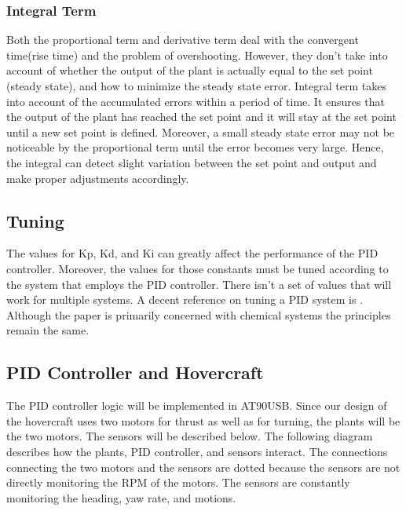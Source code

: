\subsubsection{Integral Term}
Both the proportional term and derivative term deal with the convergent time(rise time) and the problem of overshooting. However, they don't take into account of whether the output of the plant is actually equal to the set point (steady state), and how to minimize the steady state error. Integral term takes into account of the accumulated errors within a period of time. It ensures that the output of the plant has reached the set point and it will stay at the set point until a new set point is defined. Moreover, a small steady state error may not be noticeable by the proportional term until the error becomes very large. Hence, the integral can detect slight variation between the set point and output and make proper adjustments accordingly. 

\subsection{Tuning}
The values for Kp, Kd, and Ki can greatly affect the performance of the PID controller. Moreover, the values for those constants must be tuned according to the system that employs the PID controller. There isn't a set of values that will work for multiple systems.  A decent reference on tuning a PID system is \cite{Skogestad2003291}.  Although the paper is primarily concerned with chemical systems the principles remain the same.  

\subsection{PID Controller and Hovercraft}
The PID controller logic will be implemented in AT90USB. Since our design of the hovercraft uses two motors for thrust as well as for turning, the plants will be the two motors. The sensors will be described below. The following diagram describes how the plants, PID controller, and sensors interact. The connections connecting the two motors and the sensors are dotted because the sensors are not directly monitoring the RPM of the motors. The sensors are constantly monitoring the heading, yaw rate, and motions. 

